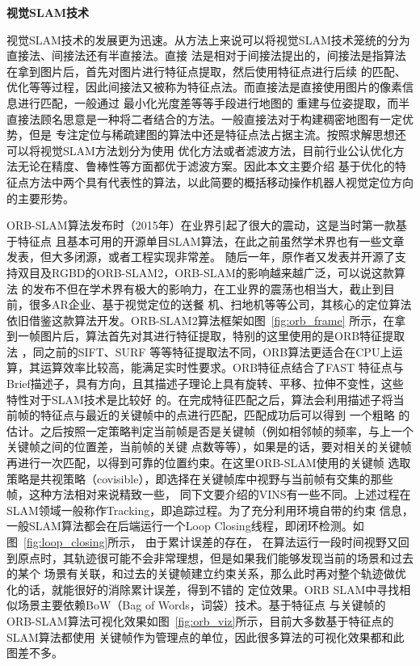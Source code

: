 \noindent \textbf{视觉SLAM技术}

视觉SLAM技术的发展更为迅速。从方法上来说可以将视觉SLAM技术笼统的分为直接法、间接法还有半直接法。直接
法是相对于间接法提出的，间接法是指算法在拿到图片后，首先对图片进行特征点提取，然后使用特征点进行后续
的匹配、优化等等过程，因此间接法又被称为特征点法。而直接法是直接使用图片的像素信息进行匹配，一般通过
最小化光度差等等手段进行地图的
重建与位姿提取，而半直接法顾名思意是一种将二者结合的方法。一般直接法对于构建稠密地图有一定优势，但是
专注定位与稀疏建图的算法中还是特征点法占据主流。按照求解思想还可以将视觉SLAM方法划分为使用
优化方法或者滤波方法，目前行业公认优化方法无论在精度、鲁棒性等方面都优于滤波方案。因此本文主要介绍
基于优化的特征点方法中两个具有代表性的算法，以此简要的概括移动操作机器人视觉定位方向的主要形势。

ORB-SLAM算法\cite{mur2015orb}发布时（2015年）在业界引起了很大的震动，这是当时第一款基于特征点
且基本可用的开源单目SLAM算法，在此之前虽然学术界也有一些文章发表，但大多闭源，或者工程实现非常差。
随后一年，原作者又发表并开源了支持双目及RGBD的ORB-SLAM2，ORB-SLAM的影响越来越广泛，可以说这款算法
的发布不但在学术界有极大的影响力，在工业界的震荡也相当大，截止到目前，很多AR企业、基于视觉定位的送餐
机、扫地机等等公司，其核心的定位算法依旧借鉴这款算法开发。ORB-SLAM2算法框架如图~\ref{fig:orb_frame}
所示，在拿到一帧图片后，算法首先对其进行特征提取，特别的这里使用的是ORB特征提取法\cite{rublee2011orb}
，同之前的SIFT、SURF
等等特征提取法不同，ORB算法更适合在CPU上运算，其运算效率比较高，能满足实时性要求。ORB特征点结合了FAST
特征点与Brief描述子，具有方向，且其描述子理论上具有旋转、平移、拉伸不变性，这些特性对于SLAM技术是比较好
的。在完成特征匹配之后，算法会利用描述子将当前帧的特征点与最近的关键帧中的点进行匹配，匹配成功后可以得到
一个粗略
的估计。之后按照一定策略判定当前帧是否是关键帧（例如相邻帧的频率，与上一个关键帧之间的位置差，当前帧的关键
点数等等），如果是的话，要对相关的关键帧再进行一次匹配，以得到可靠的位置约束。在这里ORB-SLAM使用的关键帧
选取策略是共视策略（covisible），即选择在关键帧库中视野与当前帧有交集的那些帧，这种方法相对来说精致一些，
同下文要介绍的VINS有一些不同。上述过程在SLAM领域一般称作Tracking，即追踪过程。为了充分利用环境自带的约束
信息，一般SLAM算法都会在后端运行一个Loop Closing线程，即闭环检测。如图~\ref{fig:loop_closing}所示，
由于累计误差的存在，
在算法运行一段时间视野又回到原点时，其轨迹很可能不会非常理想，但是如果我们能够发现当前的场景和过去的某个
场景有关联，和过去的关键帧建立约束关系，那么此时再对整个轨迹做优化的话，就能很好的消除累计误差，得到不错的
定位效果。ORB SLAM中寻找相似场景主要依赖BoW（Bag of Words，词袋）技术\cite{GalvezTRO12}。基于特征点
与关键帧的ORB-SLAM算法可视化效果如图~\ref{fig:orb_viz}所示，目前大多数基于特征点的SLAM算法都使用
关键帧作为管理点的单位，因此很多算法的可视化效果都和此图差不多。



